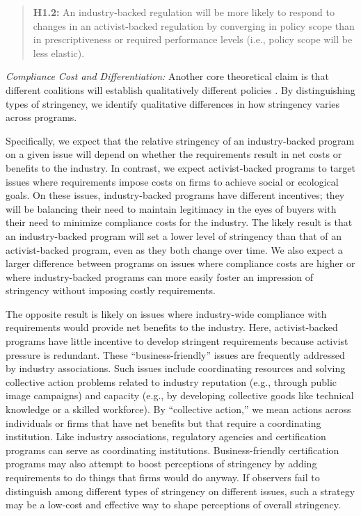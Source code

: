 \documentclass[
      12pt,
            Review ]{article}
\begin{document}
\begin{quote}
\textbf{H1.2:} An industry-backed regulation will be more likely to respond to changes in an activist-backed regulation by converging in policy scope than in prescriptiveness or required performance levels (i.e., policy scope will be less elastic).
\end{quote}

\emph{Compliance Cost and Differentiation:} Another core theoretical claim is that different coalitions will establish qualitatively different policies \citep{Botzem2012, Hsueh2012}. By distinguishing types of stringency, we identify qualitative differences in how stringency varies across programs.

Specifically, we expect that the relative stringency of an industry-backed program on a given issue will depend on whether the requirements result in net costs or benefits to the industry. In contrast, we expect activist-backed programs to target issues where requirements impose costs on firms to achieve social or ecological goals. On these issues, industry-backed programs have different incentives; they will be balancing their need to maintain legitimacy in the eyes of buyers with their need to minimize compliance costs for the industry. The likely result is that an industry-backed program will set a lower level of stringency than that of an activist-backed program, even as they both change over time. We also expect a larger difference between programs on issues where compliance costs are higher or where industry-backed programs can more easily foster an impression of stringency without imposing costly requirements.

The opposite result is likely on issues where industry-wide compliance with requirements would provide net benefits to the industry. Here, activist-backed programs have little incentive to develop stringent requirements because activist pressure is redundant. These ``business-friendly'' issues are frequently addressed by industry associations. Such issues include coordinating resources and solving collective action problems related to industry reputation (e.g., through public image campaigns) and capacity (e.g., by developing collective goods like technical knowledge or a skilled workforce). By ``collective action,'' we mean actions across individuals or firms that have net benefits but that require a coordinating institution. Like industry associations, regulatory agencies and certification programs can serve as coordinating institutions. Business-friendly certification programs may also attempt to boost perceptions of stringency by adding requirements to do things that firms would do anyway. If observers fail to distinguish among different types of stringency on different issues, such a strategy may be a low-cost and effective way to shape perceptions of overall stringency.
\end{document}
